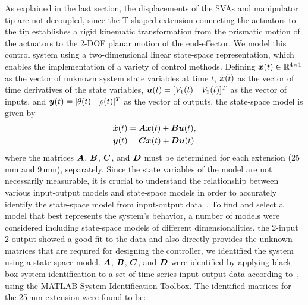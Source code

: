 As explained in the last section, the displacements of the SVAs and manipulator tip are not decoupled, since the T-shaped extension connecting the actuators to the tip establishes a rigid kinematic transformation from the prismatic motion of the actuators to the 2-DOF planar motion of the end-effector.
We model this control system using a two-dimensional linear state-space representation, which enables the implementation of a variety of control methods. Defining $\boldsymbol{x}(t) \in \mathbb{R}^{4\times1}$ as the vector of unknown system state variables at time $t$, $\dot{\boldsymbol{x}}(t)$ as the vector of time derivatives of the state variables, %
$\boldsymbol{u}(t)=[V_1(t) \quad V_2(t)]^T$ as the vector of inputs, and $\boldsymbol{y}(t)=[\theta(t) \quad \rho(t)]^T$ as the vector of outputs, the state-space model is given by
\begin{align}
\dot{\boldsymbol{x}}(t)&= \boldsymbol{A}\boldsymbol{x}(t)+\boldsymbol{B}\boldsymbol{u}(t), \nonumber\\
\boldsymbol{y}(t)&= \boldsymbol{C}\boldsymbol{x}(t)+\boldsymbol{D}\boldsymbol{u}(t)\label{eq:2Dmodel} 
\end{align}
where the matrices $\boldsymbol{A}$, $\boldsymbol{B}$, $\boldsymbol{C}$, and $\boldsymbol{D}$ must be determined for each extension (25\,mm and 9\,mm), separately. Since the state variables of the model are not necessarily measurable, it is crucial to understand the relationship between various input-output models and state-space models in order to accurately identify the state-space model from input-output data~\cite{Lim1998}. To find and select a model that best represents the system's behavior, a number of models were considered including state-space models of different dimensionalities.
the 2-input 2-output showed a good fit to the data and also directly provides the unknown matrices that are required for  designing the controller, we identified the system using a state-space model. $\boldsymbol{A}$, $\boldsymbol{B}$, $\boldsymbol{C}$, and $\boldsymbol{D}$ were identified by applying black-box system identification to a set of time series input-output data according to~\cite{Ljung2001}, using the MATLAB System Identification Toolbox. The identified matrices for the 25\,mm extension were found to be: 

